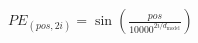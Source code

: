 \documentclass[preview]{standalone}
\begin{document}
\begin{align*}
PE_{(pos, 2i)} = \sin\left(\frac{pos}{10000^{2i/d_{\text{model}}}}\right)
\end{align*}
\end{document}
